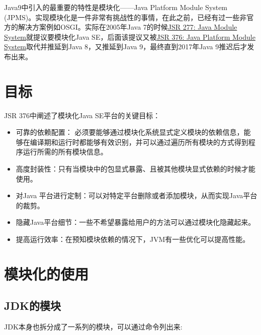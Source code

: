\documentclass[12pt]{article}
\begin{document}
\makeblogtitle

Java9中引入的最重要的特性是模块化------Java Platform Module System (JPMS)。实现模块化是一件非常有挑战性的事情，在此之前，已经有过一些非官方的解决方案例如OSGI。实际在2005年Java 7的时候\href{https://jcp.org/en/jsr/detail?id=277}{JSR 277: Java Module System}就提议要模块化Java SE，后面该提议又被\href{https://jcp.org/en/jsr/detail?id=376}{JSR 376: Java Platform Module System}取代并推延到Java 8，又推延到Java 9，最终直到2017年Java 9推迟后才发布出来。

\section{目标}\label{ux76eeux6807}

JSR 376中阐述了模块化Java SE平台的关键目标：

\begin{itemize}
\tightlist
\item
  可靠的依赖配置： 必须要能够通过模块化系统显式定义模块的依赖信息，能够在编译期和运行时都能够有效识别，并可以通过遍历所有模块的方式得到程序运行所需的所有模块信息。
\item
  高度封装性：只有当模块中的包显式暴露、且被其他模块显式依赖的时候才能使用。
\item
  对Java 平台进行定制：可以对特定平台删除或者添加模块，从而实现Java平台的裁剪。
\item
  隐藏Java平台细节：一些不希望暴露给用户的方法可以通过模块化隐藏起来。
\item
  提高运行效率：在预知模块依赖的情况下，JVM有一些优化可以提高性能。
\end{itemize}

\section{模块化的使用}\label{ux6a21ux5757ux5316ux7684ux4f7fux7528}

\subsection{JDK的模块}\label{jdkux7684ux6a21ux5757}

JDK本身也拆分成了一系列的模块，可以通过命令列出来:

\begin{Shaded}
\begin{Highlighting}[]
                                    

\end{Highlighting}
\end{Shaded}
\end{document}
